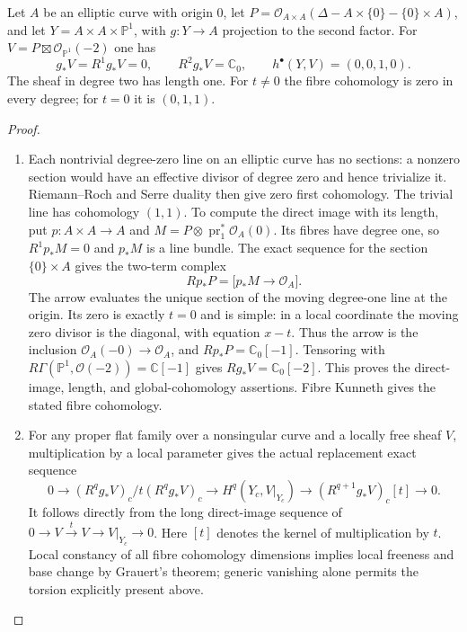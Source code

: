 \begin{proposition}\hypertarget{tag-01GJ}{}\label{cdp:st:E12}

Let $A$ be an elliptic curve with origin $0$, let
$P=\mathcal O_{A\times A}(\Delta-A\times\{0\}-\{0\}\times A)$,
and let $Y=A\times A\times\mathbb P^1$, with $g:Y\to A$
projection to the second factor. For
$V=P\boxtimes\mathcal O_{\mathbb P^1}(-2)$ one has
\[
 g_*V=R^1g_*V=0,\qquad R^2g_*V=\mathbb C_0,
 \qquad h^\bullet(Y,V)=(0,0,1,0).
\]
The sheaf in degree two has length one. For $t\ne0$ the fibre
cohomology is zero in every degree; for $t=0$ it is $(0,1,1)$.
\end{proposition}


\begin{proof}

\begin{enumerate}[label={$\langle1\rangle$\arabic*.},leftmargin=*]
\item Each nontrivial degree-zero line on an elliptic curve has no
sections: a nonzero section would have an effective divisor of
degree zero and hence trivialize it. Riemann--Roch and Serre
duality then give zero first cohomology. The trivial line has
cohomology $(1,1)$. To compute the direct image with its length,
put $p:A\times A\to A$ and $M=P\otimes\operatorname{pr}_1^*
\mathcal O_A(0)$. Its fibres have degree one, so
$R^1p_*M=0$ and $p_*M$ is a line bundle. The exact sequence for
the section $\{0\}\times A$ gives the two-term complex
\[
 Rp_*P=\bigl[p_*M\longrightarrow\mathcal O_A\bigr].
\]
The arrow evaluates the unique section of the moving degree-one
line at the origin. Its zero is exactly $t=0$ and is simple:
in a local coordinate the moving zero divisor is the diagonal,
with equation $x-t$. Thus the arrow is the inclusion
$\mathcal O_A(-0)\to\mathcal O_A$, and
$Rp_*P=\mathbb C_0[-1]$. Tensoring with
$R\Gamma(\mathbb P^1,\mathcal O(-2))=\mathbb C[-1]$
gives $Rg_*V=\mathbb C_0[-2]$. This proves the direct-image,
length, and global-cohomology assertions. Fibre Kunneth gives
the stated fibre cohomology.

\item For any proper flat family over a nonsingular curve and a locally
free sheaf $V$, multiplication by a local parameter gives the
actual replacement exact sequence
\[
0\to (R^qg_*V)_c/t(R^qg_*V)_c
 \to H^q(Y_c,V|_{Y_c})
 \to (R^{q+1}g_*V)_c[t]\to0.
\]
It follows directly from the long direct-image sequence of
$0\to V\xrightarrow{t}V\to V|_{Y_c}\to0$. Here $[t]$ denotes
the kernel of multiplication by $t$. Local constancy of all
fibre cohomology dimensions implies local freeness and base
change by Grauert's theorem; generic vanishing alone permits
the torsion explicitly present above.

\end{enumerate}
\end{proof}